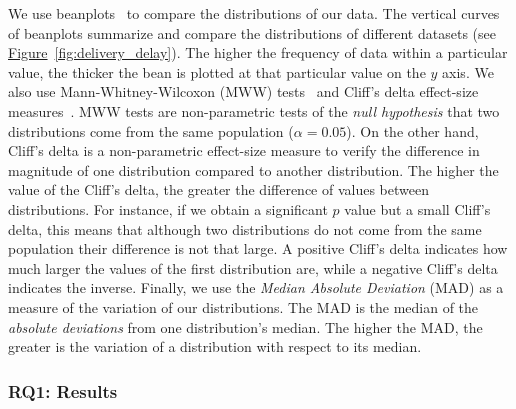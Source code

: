 We use beanplots~\cite{kampstra2008beanplot} to compare the distributions of our
data. The vertical curves of beanplots summarize and compare the distributions
of different datasets (see
\hyperref[fig:delivery_delay]{Figure}~\ref{fig:delivery_delay}). The higher
the frequency of data within a particular value, the thicker the bean is plotted
at that particular value on the $y$ axis. We also use Mann-Whitney-Wilcoxon
(MWW) tests~\cite{wilks2011statistical} and Cliff's delta effect-size
measures~\cite{cliff1993dominance}. MWW tests are non-parametric tests of the
\textit{null hypothesis} that two distributions come from the same population
($\alpha=0.05$). On the other hand, Cliff's delta is a non-parametric
effect-size measure to verify the difference in magnitude of one distribution compared
to another distribution. The higher the value of the Cliff's delta,
the greater the difference of values between distributions. For instance, if we
obtain a significant $p$ value but a small Cliff's delta, this means that
although two distributions do not come from the same population their 
difference is not that large. A positive Cliff's delta indicates how much
larger the values of the first distribution are, while a negative Cliff's delta
indicates the inverse. Finally, we use the \textit{Median Absolute Deviation}
(MAD) \cite{howell2005median,leys2013detecting} as a measure of the variation of
our distributions. The MAD is the median of the \textit{absolute deviations}
from one distribution's median. The higher the MAD, the greater is the variation
of a distribution with respect to its median.

\subsubsection*{RQ1: Results}

